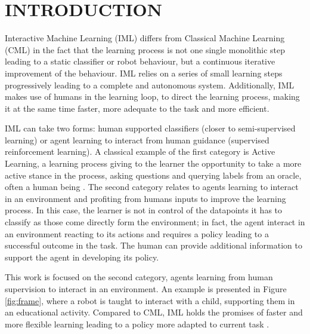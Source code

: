 \documentclass[letterpaper, 10 pt, conference]{ieeeconf}  %
\begin{document}
\section{INTRODUCTION}

Interactive Machine Learning (IML) \cite{fails2003interactive,amershi2014power} differs from Classical Machine Learning (CML) in the fact that the learning process is not one single monolithic step leading to a static classifier or robot behaviour, but a continuous iterative improvement of the behaviour. IML relies on a series of small learning steps progressively leading to a complete and autonomous system. Additionally, IML makes use of humans in the learning loop, to direct the learning process, making it at the same time faster, more adequate to the task and more efficient.

IML can take two forms: human supported classifiers (closer to semi-supervised learning) or agent learning to interact from human guidance (supervised reinforcement learning). A classical example of the first category is Active Learning, a learning process giving to the learner the opportunity to take a more active stance in the process, asking questions and querying labels from an oracle, often a human being \cite{settles2012active}. The second category relates to agents learning to interact in an environment and profiting from humans inputs to improve the learning process. In this case, the learner is not in control of the datapoints it has to classify as those come directly form the environment; in fact, the agent interact in an environment reacting to its actions and requires a policy leading to a successful outcome in the task. The human can provide additional information to support the agent in developing its policy.

This work is focused on the second category, agents learning from human supervision to interact in an environment. An example is presented in Figure \ref{fig:frame}, where a robot is taught to interact with a child, supporting them in an educational activity. Compared to CML, IML holds the promises of faster and more flexible learning leading to a policy more adapted to current task \cite{fails2003interactive,amershi2014power}.
\end{document}
